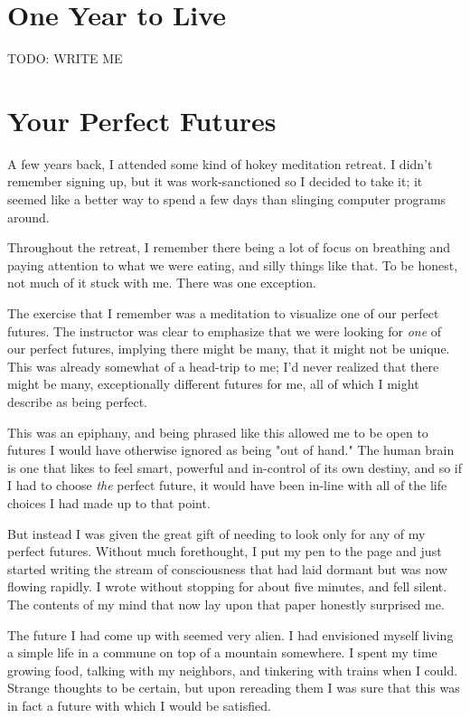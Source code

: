 \documentclass[]{book}
\newcommand{\TOWRITE}{TODO: WRITE ME}
\begin{document}
\chapter{One Year to Live}

\TOWRITE

\chapter{Your Perfect Futures}

A few years back, I attended some kind of hokey meditation retreat. I didn't
remember signing up, but it was work-sanctioned so I decided to take it; it
seemed like a better way to spend a few days than slinging computer programs
around.

Throughout the retreat, I remember there being a lot of focus on breathing and
paying attention to what we were eating, and silly things like that. To be
honest, not much of it stuck with me. There was one exception.

The exercise that I remember was a meditation to visualize one of our perfect
futures. The instructor was clear to emphasize that we were looking for
\emph{one} of our perfect futures, implying there might be many, that it
might not be unique. This was already somewhat of a head-trip to me; I'd never
realized that there might be many, exceptionally different futures for me, all
of which I might describe as being perfect.

This was an epiphany, and being phrased like this allowed me to be open to
futures I would have otherwise ignored as being "out of hand." The human brain
is one that likes to feel smart, powerful and in-control of its own destiny, and
so if I had to choose \emph{the} perfect future, it would have been in-line
with all of the life choices I had made up to that point.

But instead I was given the great gift of needing to look only for any of my
perfect futures. Without much forethought, I put my pen to the page and just
started writing the stream of consciousness that had laid dormant but was now
flowing rapidly. I wrote without stopping for about five minutes, and fell
silent. The contents of my mind that now lay upon that paper honestly surprised
me.

The future I had come up with seemed very alien. I had envisioned myself living
a simple life in a commune on top of a mountain somewhere. I spent my time
growing food, talking with my neighbors, and tinkering with trains when I could.
Strange thoughts to be certain, but upon rereading them I was sure that this was
in fact a future with which I would be satisfied.
\end{document}
